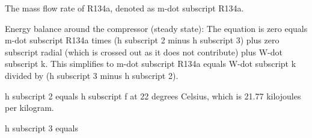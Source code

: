 The mass flow rate of R134a, denoted as m-dot subscript R134a.

Energy balance around the compressor (steady state):
The equation is zero equals m-dot subscript R134a times (h subscript 2 minus h subscript 3) plus zero subscript radial (which is crossed out as it does not contribute) plus W-dot subscript k. This simplifies to m-dot subscript R134a equals W-dot subscript k divided by (h subscript 3 minus h subscript 2).

h subscript 2 equals h subscript f at 22 degrees Celsius, which is 21.77 kilojoules per kilogram.

h subscript 3 equals